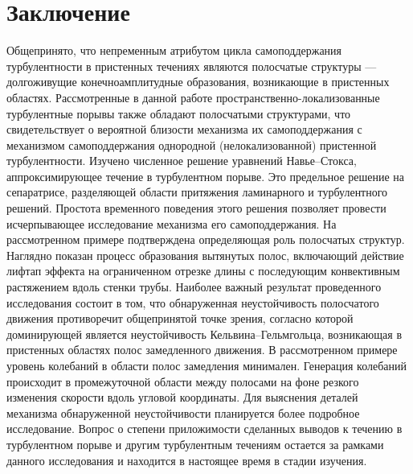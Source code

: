 \chapter*{Заключение} 

Общепринято, что непременным атрибутом цикла самоподдержания турбулентности в пристенных течениях являются полосчатые структуры --- долгоживущие конечноамплитудные образования, возникающие в пристенных областях. Рассмотренные в данной работе пространственно-локализованные турбулентные порывы также обладают полосчатыми структурами, что свидетельствует о вероятной близости механизма их самоподдержания с механизмом самоподдержания однородной (нелокализованной) пристенной турбулентности. Изучено численное решение уравнений Навье--Стокса, аппроксимирующее течение в турбулентном порыве. Это предельное решение на сепаратрисе, разделяющей области притяжения ламинарного и турбулентного решений. Простота временного поведения этого решения позволяет провести исчерпывающее исследование механизма его самоподдержания. На рассмотренном примере подтверждена определяющая роль полосчатых структур. Наглядно показан процесс образования вытянутых полос, включающий действие лифтап  эффекта на ограниченном отрезке длины с последующим конвективным растяжением вдоль стенки трубы. Наиболее важный результат проведенного исследования состоит в том, что обнаруженная неустойчивость полосчатого движения противоречит общепринятой точке зрения, согласно которой доминирующей является неустойчивость Кельвина--Гельмгольца, возникающая в пристенных областях полос замедленного движения. В рассмотренном примере уровень колебаний в области полос замедления минимален. Генерация колебаний происходит в промежуточной области между полосами на фоне резкого изменения скорости вдоль угловой координаты. Для выяснения деталей механизма обнаруженной неустойчивости планируется более подробное исследование. Вопрос о степени приложимости сделанных выводов к течению в турбулентном порыве и другим турбулентным течениям остается за рамками данного исследования и находится в настоящее время в стадии изучения.
